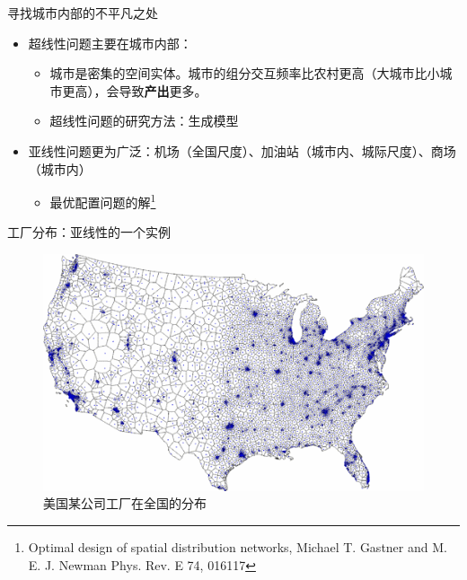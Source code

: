\documentclass[utf8]{ctexbeamer}
\begin{document}
\begin{frame}{寻找城市内部的不平凡之处}
    
    \begin{itemize}
        \item 超线性问题主要在城市内部：
        \begin{itemize}
            \item 城市是密集的空间实体。城市的组分交互频率比农村更高（大城市比小城市更高），会导致\textbf{产出}更多。
            \item 超线性问题的研究方法：生成模型
        \end{itemize}
        \item 亚线性问题更为广泛：机场（全国尺度）、加油站（城市内、城际尺度）、商场（城市内）
        \begin{itemize}
            \item 最优配置问题的解\footnote{Optimal design of spatial distribution networks, Michael T. Gastner and M. E. J. Newman
            Phys. Rev. E 74, 016117}
        \end{itemize}
    \end{itemize}
\end{frame}

\begin{frame}{工厂分布：亚线性的一个实例}
    \begin{figure}
        \centering
        \includegraphics[width = 0.5\linewidth]{图片/distributednetwotk.png}
        \caption{美国某公司工厂在全国的分布}
    \end{figure}
\end{frame}
\end{document}
